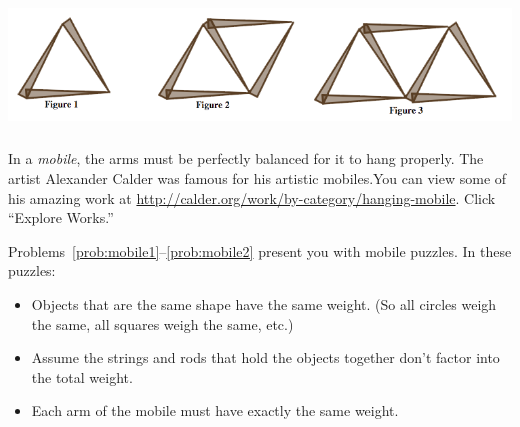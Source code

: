 \newpage

\bigskip

\begin{problem}\label{prob:toothpics4}\ 

\begin{center}
\includegraphics[height=3.5cm]{toothpicks3}
\end{center}

\end{problem}

\newpage


In a \emph{mobile}, the arms must be perfectly balanced for it to hang properly.  The artist Alexander Calder was famous for his artistic mobiles.You can view some of his amazing work at \url{http://calder.org/work/by-category/hanging-mobile}.  Click ``Explore Works.''

\bigskip

Problems~\ref{prob:mobile1}--\ref{prob:mobile2} present you with mobile puzzles.     In these puzzles:
\begin{itemize}
\item
Objects that are the same shape have the same weight.  (So all circles weigh the same, all squares weigh the same, etc.) \\
 \item
Assume the strings and rods that hold the objects together don't factor into the total weight.\\
\item
Each arm of the mobile must have exactly the same weight.
\end{itemize}

\bigskip
\bigskip
\bigskip

